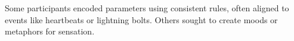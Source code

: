 %    
%
%    

    Some participants encoded parameters using consistent rules, often aligned to events like heartbeats or lightning bolts.
    Others sought to create moods or metaphors for sensation.
    
